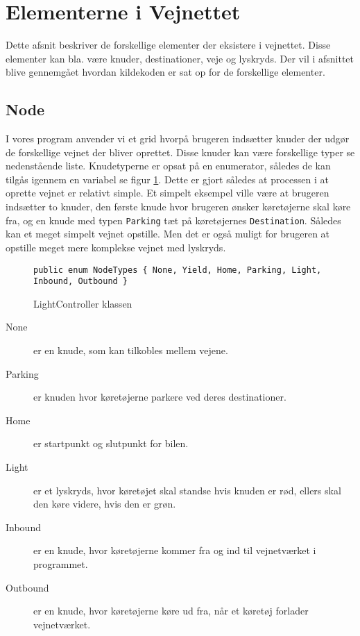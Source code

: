 \section{Elementerne i Vejnettet}\label{ElementerVejnettet}
Dette afsnit beskriver de forskellige elementer der eksistere i vejnettet. Disse elementer kan bla. være knuder, destinationer, veje og lyskryds. Der vil i afsnittet blive gennemgået hvordan kildekoden er sat op for de forskellige elementer. 

\subsection{Node}
I vores program anvender vi et grid hvorpå brugeren indsætter knuder der udgør de forskellige vejnet der bliver oprettet. Disse knuder kan være forskellige typer se nedenstående liste. Knudetyperne er opsat på en enumerator, således de kan tilgås igennem en variabel se figur \ref{enumNodeTypes}. Dette er gjort således at processen i at oprette vejnet er relativt simple. Et simpelt eksempel ville være at brugeren indsætter to knuder, den første knude hvor brugeren ønsker køretøjerne skal køre fra, og en knude med typen \texttt{Parking} tæt på køretøjernes \texttt{Destination}. Således kan et meget simpelt vejnet opstille. Men det er også muligt for brugeren at opstille meget mere komplekse vejnet med lyskryds.

\begin{figure}[H]
\begin{lstlisting}
public enum NodeTypes { None, Yield, Home, Parking, Light, Inbound, Outbound }
\end{lstlisting}
\caption{LightController klassen}\label{enumNodeTypes}
\end{figure}

\begin{description}
\item [None] er en knude, som kan tilkobles mellem vejene.
\item [Parking] er knuden hvor køretøjerne parkere ved deres destinationer.
\item [Home] er startpunkt og slutpunkt for bilen.
\item [Light] er et lyskryds, hvor køretøjet skal standse hvis knuden er rød, ellers skal den køre videre, hvis den er grøn.
\item [Inbound] er en knude, hvor køretøjerne kommer fra og ind til vejnetværket i programmet.
\item [Outbound] er en knude, hvor køretøjerne køre ud fra, når et køretøj forlader vejnetværket.
\end{description}

